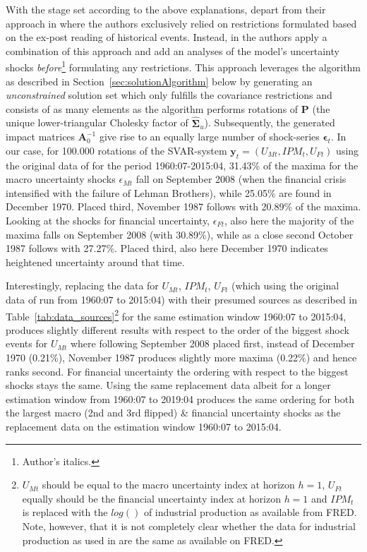 \documentclass[a4paper,11pt,listof=nochaptergap,oneside,pointednumbers,bibtotoc,bigheadings,liststotoc,hidelinks]{scrbook}
\theoremstyle{mysatz}
\theoremstyle{mydefinition}
\theoremstyle{mytheorem}
\theoremstyle{mybemerkung}
\let\oldhat\hat
\newcommand{\vect}[1]{\boldsymbol{\mathbf{#1}}}
\newcommand{\hatt}[1]{\oldhat{\boldsymbol{\mathbf{#1}}}}
\begin{document}
With the stage set according to the above explanations, \citet{ludvigsonetal:19} depart from their approach in \citet{ludvigsonetal:18} where the authors exclusively relied on restrictions formulated based on the ex-post reading of historical events. Instead, in \citet{ludvigsonetal:19} the authors apply a combination of this approach and add an analyses of the model's uncertainty shocks \textit{before}\footnote{Author's italics.} formulating any restrictions. This approach leverages the algorithm as described in Section~\ref{sec:solutionAlgorithm} below by generating an \textit{unconstrained} solution set which only fulfills the covariance restrictions and consists of as many elements as the algorithm performs rotations of $\vect{P}$ (the unique lower-triangular Cholesky factor of $\hatt{\vect{\Sigma}}_u$). Subsequently, the generated impact matrices $\vect{A}_0^{-1}$ give rise to an equally large number of shock-series $\vect{\epsilon}_t$. In our case, for 100.000 rotations of the SVAR-system $\vect{y}_t = (U_{Mt}, IPM_{t}, U_{Ft})$ using the original data of \citet{ludvigsonetal:18, ludvigsonetal:19} for the period 1960:07-2015:04, 31.43\% of the maxima for the macro uncertainty shocks $\epsilon_{Mt}$ fall on September 2008 (when the financial crisis intensified with the failure of Lehman Brothers), while 25.05\% are found in December 1970. Placed third, November 1987 follows with 20.89\% of the maxima. Looking at the shocks for financial uncertainty, $\epsilon_{Ft}$, also here the majority of the maxima falls on September 2008 (with 30.89\%), while as a close second October 1987 follows with 27.27\%. Placed third, also here December 1970 indicates heightened uncertainty around that time.

Interestingly, replacing the data for $U_{Mt}$, $IPM_{t}$, $U_{Ft}$ (which using the original data of \citet{ludvigsonetal:18, ludvigsonetal:19} run from 1960:07 to 2015:04) with their presumed sources as described in Table~\ref{tab:data_sources}\footnote{$U_{Mt}$ should be equal to the macro uncertainty index at horizon $h=1$, $U_{Ft}$ equally should be the financial uncertainty index at horizon $h=1$ and $IPM_{t}$ is replaced with the $log()$ of industrial production as available from FRED. Note, however, that it is not completely clear whether the data for industrial production as used in \citet{ludvigsonetal:18, ludvigsonetal:19} are the same as available on FRED.} for the same estimation window 1960:07 to 2015:04, produces slightly different results with respect to the order of the biggest shock events for $U_{Mt}$ where following September 2008 placed first, instead of December 1970 (0.21\%), November 1987 produces slightly more maxima (0.22\%) and hence ranks second. For financial uncertainty the ordering with respect to the biggest shocks stays the same. Using the same replacement data albeit for a longer estimation window from 1960:07 to 2019:04 produces the same ordering for both the largest macro (2nd and 3rd flipped) \& financial uncertainty shocks as the replacement data on the estimation window 1960:07 to 2015:04. 
\end{document}
